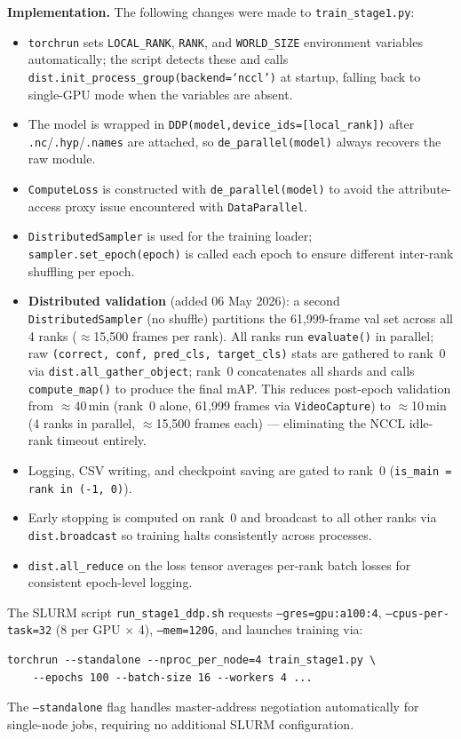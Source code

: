 \textbf{Implementation.} The following changes were made to
\texttt{train\_stage1.py}:
\begin{itemize}
    \item \texttt{torchrun} sets \texttt{LOCAL\_RANK}, \texttt{RANK},
          and \texttt{WORLD\_SIZE} environment variables automatically;
          the script detects these and calls
          \texttt{dist.init\_process\_group(backend=`nccl')} at startup,
          falling back to single-GPU mode when the variables are absent.
    \item The model is wrapped in \texttt{DDP(model,\;device\_ids=[local\_rank])}
          after \texttt{.nc}/\texttt{.hyp}/\texttt{.names} are attached,
          so \texttt{de\_parallel(model)} always recovers the raw module.
    \item \texttt{ComputeLoss} is constructed with
          \texttt{de\_parallel(model)} to avoid the attribute-access
          proxy issue encountered with \texttt{DataParallel}.
    \item \texttt{DistributedSampler} is used for the training loader;
          \texttt{sampler.set\_epoch(epoch)} is called each epoch to
          ensure different inter-rank shuffling per epoch.
    \item \textbf{Distributed validation} (added 06 May 2026): a second
          \texttt{DistributedSampler} (no shuffle) partitions the 61,999-frame
          val set across all 4 ranks ($\approx$15,500 frames per rank).
          All ranks run \texttt{evaluate()} in parallel; raw
          \texttt{(correct, conf, pred\_cls, target\_cls)} stats are gathered
          to rank~0 via \texttt{dist.all\_gather\_object}; rank~0
          concatenates all shards and calls \texttt{compute\_map()} to produce
          the final mAP. This reduces post-epoch validation from
          $\approx$40\,min (rank~0 alone, 61,999 frames via
          \texttt{VideoCapture}) to $\approx$10\,min (4 ranks in
          parallel, $\approx$15,500 frames each) — eliminating the NCCL
          idle-rank timeout entirely.
    \item Logging, CSV writing, and checkpoint saving are gated to rank~0
          (\texttt{is\_main = rank in (-1, 0)}).
    \item Early stopping is computed on rank~0 and broadcast to all
          other ranks via \texttt{dist.broadcast} so training halts
          consistently across processes.
    \item \texttt{dist.all\_reduce} on the loss tensor averages
          per-rank batch losses for consistent epoch-level logging.
\end{itemize}
The SLURM script \texttt{run\_stage1\_ddp.sh} requests
\texttt{--gres=gpu:a100:4}, \texttt{--cpus-per-task=32} (8 per
GPU $\times$ 4), \texttt{--mem=120G}, and launches training via:
\begin{verbatim}
torchrun --standalone --nproc_per_node=4 train_stage1.py \
    --epochs 100 --batch-size 16 --workers 4 ...
\end{verbatim}
The \texttt{--standalone} flag handles master-address negotiation
automatically for single-node jobs, requiring no additional SLURM
configuration.

